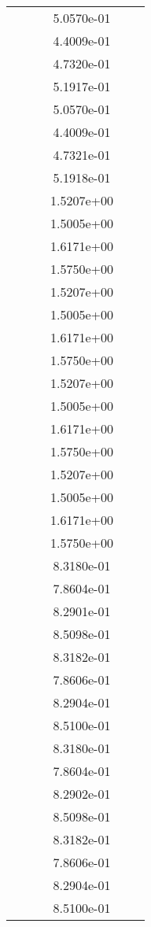 \begin{xltabular}{\textwidth}{r|rS[table-format=1.3e+2]S[table-format=1.4e+2]S[table-format=1.4e+2]S[table-format=-1.5]}
&  &  & 5.0570e-01 & & \\
&  &  & 4.4009e-01 & & \\
&  &  & 4.7320e-01 & & \\
&  &  & 5.1917e-01 & & \\
&  &  & 5.0570e-01 & & \\
&  &  & 4.4009e-01 & & \\
&  &  & 4.7321e-01 & & \\
&  &  & 5.1918e-01 & & \\
&  &  & 1.5207e+00 & & \\
&  &  & 1.5005e+00 & & \\
&  &  & 1.6171e+00 & & \\
&  &  & 1.5750e+00 & & \\
&  &  & 1.5207e+00 & & \\
&  &  & 1.5005e+00 & & \\
&  &  & 1.6171e+00 & & \\
&  &  & 1.5750e+00 & & \\
&  &  & 1.5207e+00 & & \\
&  &  & 1.5005e+00 & & \\
&  &  & 1.6171e+00 & & \\
&  &  & 1.5750e+00 & & \\
&  &  & 1.5207e+00 & & \\
&  &  & 1.5005e+00 & & \\
&  &  & 1.6171e+00 & & \\
&  &  & 1.5750e+00 & & \\
&  &  & 8.3180e-01 & & \\
&  &  & 7.8604e-01 & & \\
&  &  & 8.2901e-01 & & \\
&  &  & 8.5098e-01 & & \\
&  &  & 8.3182e-01 & & \\
&  &  & 7.8606e-01 & & \\
&  &  & 8.2904e-01 & & \\
&  &  & 8.5100e-01 & & \\
&  &  & 8.3180e-01 & & \\
&  &  & 7.8604e-01 & & \\
&  &  & 8.2902e-01 & & \\
&  &  & 8.5098e-01 & & \\
&  &  & 8.3182e-01 & & \\
&  &  & 7.8606e-01 & & \\
&  &  & 8.2904e-01 & & \\
&  &  & 8.5100e-01 & & \\

\end{xltabular}
